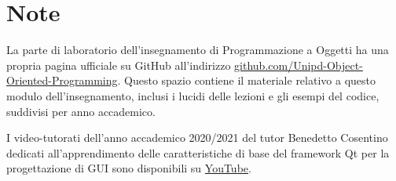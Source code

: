 \documentclass[10pt,a4paper,oneside]{article}
\begin{document}
\section{Note}
La parte di laboratorio dell'insegnamento di Programmazione a Oggetti ha una propria pagina ufficiale su GitHub all'indirizzo \href{https://github.com/Unipd-Object-Oriented-Programming}{github.com/Unipd-Object-Oriented-Programming}. Questo spazio contiene il materiale relativo a questo modulo dell'insegnamento, inclusi i lucidi delle lezioni e gli esempi del codice, suddivisi per anno accademico.

I video-tutorati dell'anno accademico 2020/2021 del tutor Benedetto Cosentino dedicati all'apprendimento delle caratteristiche di base del framework Qt per la progettazione di GUI sono disponibili su \href{https://www.youtube.com/playlist?list=PLH_Fd-836q-VcqWnnzsq3GOF2-0i_Az7p}{YouTube}.
\end{document}
